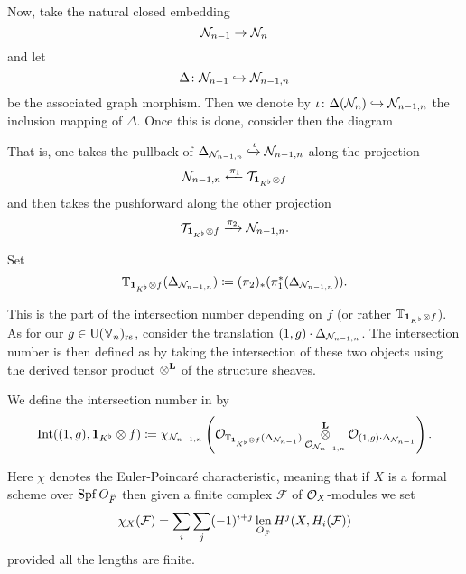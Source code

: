 Now, take the natural closed embedding
\[ \mathcal N_{n-1} \to \mathcal N_n \]
and let
\[ \Delta \colon \mathcal N_{n-1} \hookrightarrow \mathcal N_{n-1,n} \]
be the associated graph morphism.
Then we denote by $\iota \colon \Delta(\mathcal N_n) \hookrightarrow \mathcal N_{n-1,n}$
the inclusion mapping of $\Delta$.
Once this is done, consider then the diagram
\begin{center}
\end{center}
That is, one takes the pullback of
$\Delta_{\mathcal N_{n-1,n}} \xhookrightarrow{\iota} \mathcal N_{n-1,n}$
along the projection
\[ \mathcal N_{n-1,n} \xleftarrow{\pi_1} \mathcal{T}_{\mathbf{1}_{K^\flat} \otimes f} \]
and then takes the pushforward along the other projection
\[ \mathcal{T}_{\mathbf{1}_{K^\flat} \otimes f} \xrightarrow{\pi_2} \mathcal N_{n-1,n}. \]
\begin{definition}
  Set
  \[
    \mathbb T_{\mathbf{1}_{K^\flat} \otimes f} (\Delta_{\mathcal N_{n-1,n}})
    \coloneqq (\pi_2)_\ast(\pi_1^\ast(\Delta_{\mathcal N_{n-1,n}})).
  \]
\end{definition}
This is the part of the intersection number depending on $f$
(or rather $\mathbb T_{\mathbf{1}_{K^\flat} \otimes f}$).
As for our $g \in \operatorname{U}(\mathbb V_n)_{\mathrm{rs}}$,
consider the translation $(1,g) \cdot \Delta_{\mathcal N_{n-1,n}}$.
The intersection number is then defined as by taking the intersection
of these two objects using the derived tensor product $\mathop{\otimes}^{\mathbf{L}}$ of the structure sheaves.
\begin{definition}
  We define the intersection number in  by
  \[
    \operatorname{Int}((1,g), \mathbf{1}_{K^\flat} \otimes f)
    \coloneqq \chi_{\mathcal N_{n-1,n}} \left(
      \mathcal{O}_{\mathbb T_{\mathbf{1}_{K^\flat} \otimes f} (\Delta_{\mathcal N_{n-1}})}
      \mathop{\otimes}^{\mathbf{L}}_{\mathcal{O}_{\mathcal N_{n-1,n}}} \mathcal{O}_{(1,g) \cdot \Delta_{\mathcal N_{n-1}}} \right).
  \]
  \label{def:intersection_number_inhomog}
\end{definition}
Here $\chi$ denotes the Euler-Poincar\'{e} characteristic,
meaning that if $X$ is a formal scheme over $\operatorname{Spf} O_{\breve F}$
then given a finite complex $\mathcal{F}$ of $\mathcal{O}_X$-modules we set
\[ \chi_X(\mathcal{F}) = \sum_i \sum_j (-1)^{i+j}
  \operatorname*{len}_{O_{\breve F}} H^j(X, H_i(\mathcal F)) \]
provided all the lengths are finite.

